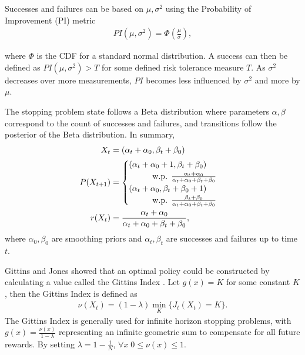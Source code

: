 Successes and failures can be based on $\mu, \sigma^2$ using the Probability of Improvement (PI) metric
\begin{align}
  PI(\mu, \sigma^2) = \Phi(\frac{\mu}{\sigma}),
\end{align}

where $\Phi$ is the CDF for a standard normal distribution. A success can then be defined as $PI(\mu, \sigma^2) > T$ for some defined risk tolerance measure $T$. As $\sigma^2$ decreases over more measurements, $PI$ becomes less influenced by $\sigma^2$ and more by $\mu$. 

The stopping problem state follows a Beta distribution where parameters $\alpha,\beta$ correspond to the count of successes and failures, and transitions follow the posterior of the Beta distribution. In summary,
\begin{align}
\begin{split}
  X_t &= (\alpha_t + \alpha_0, \beta_t + \beta_0) \\
  P(X_{t+1}) &=
  \begin{cases}
      (\alpha_t + \alpha_0 + 1, \beta_t + \beta_0)
      \\ \hspace*{1cm}\text{w.p. } \frac{\alpha_t + \alpha_0}{\alpha_t + \alpha_0 + \beta_t + \beta_0}\\
      (\alpha_t + \alpha_0, \beta_t + \beta_0 + 1)
      \\ \hspace*{1cm}\text{w.p. } \frac{\beta_t + \beta_0}{\alpha_t + \alpha_0 + \beta_t + \beta_0}
  \end{cases}\\
  r(X_t) &= \frac{\alpha_t + \alpha_0}{\alpha_t + \alpha_0 + \beta_t + \beta_0},\\
\end{split}
\end{align}
where $\alpha_0,\beta_0$ are smoothing priors and $\alpha_t,\beta_t$ are successes and failures up to time $t$.

Gittins and Jones showed that an optimal policy could be constructed by calculating a value called the Gittins Index \citep{doi:10.1002/9781118596333.ch24}. Let $g(x) = K$ for some constant $K$, then the Gittins Index is defined as
\begin{align}
  \nu(X_t) = (1-\lambda)\min_{K} \{J_t(X_t) = K\}.
\end{align}
The Gittins Index is generally used for infinite horizon stopping problems, with $g(x)=\frac{\nu(x)}{1-\lambda}$ representing an infinite geometric sum to compensate for all future rewards. By setting $\lambda=1-\frac{1}{N}$, $\forall x \; 0 \leq \nu(x) \leq 1$.

